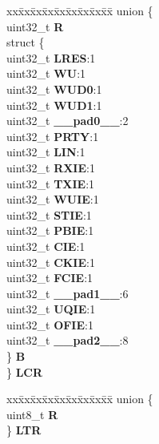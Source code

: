 \begin{DoxyCompactItemize}
\begin{tabbing}
\end{tabbing}\item 
\mbox{\label{structESCI__tag_a4e885d5d6393bc9be24a1ba94a5f2dc7}} 
\begin{tabbing}
xx\=xx\=xx\=xx\=xx\=xx\=xx\=xx\=xx\=\kill
union \{\\
\>uint32\_t {\bfseries R}\\
\>struct \{\\
\>\>uint32\_t {\bfseries LRES}:1\\
\>\>uint32\_t {\bfseries WU}:1\\
\>\>uint32\_t {\bfseries WUD0}:1\\
\>\>uint32\_t {\bfseries WUD1}:1\\
\>\>uint32\_t {\bfseries \_\_pad0\_\_}:2\\
\>\>uint32\_t {\bfseries PRTY}:1\\
\>\>uint32\_t {\bfseries LIN}:1\\
\>\>uint32\_t {\bfseries RXIE}:1\\
\>\>uint32\_t {\bfseries TXIE}:1\\
\>\>uint32\_t {\bfseries WUIE}:1\\
\>\>uint32\_t {\bfseries STIE}:1\\
\>\>uint32\_t {\bfseries PBIE}:1\\
\>\>uint32\_t {\bfseries CIE}:1\\
\>\>uint32\_t {\bfseries CKIE}:1\\
\>\>uint32\_t {\bfseries FCIE}:1\\
\>\>uint32\_t {\bfseries \_\_pad1\_\_}:6\\
\>\>uint32\_t {\bfseries UQIE}:1\\
\>\>uint32\_t {\bfseries OFIE}:1\\
\>\>uint32\_t {\bfseries \_\_pad2\_\_}:8\\
\>\} {\bfseries B}\\
\} {\bfseries LCR}\\

\end{tabbing}\item 
\mbox{\label{structESCI__tag_ad34ec43e9ac68cd8bfe2f4fd04ada0e5}} 
\begin{tabbing}
xx\=xx\=xx\=xx\=xx\=xx\=xx\=xx\=xx\=\kill
union \{\\
\>uint8\_t {\bfseries R}\\
\} {\bfseries LTR}\\


\end{tabbing}
\end{DoxyCompactItemize}
